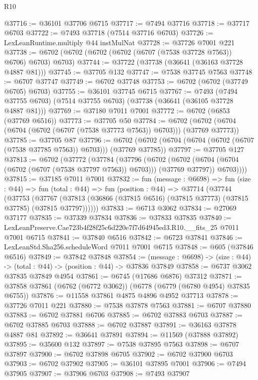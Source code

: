 \begin{lexlean}{R10}
\begin{coremodule}
@37716 := @36101 @37706 @6715
@37717 := @7494 @37716
@37718 := @37717 @6703
@37722 := @7493 @37718 (@7514 @37716 @6703)
@37726 := LexLeanRuntime.multiply @44 instMulNat
@37728 := @37726 @7001 @221
@37738 := @6702 (@6702 (@6702 (@6702 (@6707 (@7538 @37728 @7563)) @6706) @6703) @6703)
@37744 := @37722 (@37738 (@36641 (@36163 @37728 @4887 @81)))
@37745 := @37705 @132
@37747 := @7538 @37745 @7563
@37748 := @6707 @37747
@37749 := @6702 @37748
@37753 := @6702 (@6702 (@37749 @6705) @6703)
@37755 := @36101 @37745 @6715
@37767 := @7493
    (@7494 @37755 @6703)
    (@7514 @37755 @6703)
    (@37738 (@36641 (@36105 @37728 @4887 @81)))
@37769 := @37180 @7011 @7001
@37772 := @6702 (@6853 (@37769 @6516))
@37773 := @37705 @50
@37784 := @6702 (@6702 (@6704 (@6704 (@6702 (@6707 (@7538 @37773 @7563)) @6703))) (@37769 @37773))
@37785 := @37705 @87
@37796 := @6702 (@6702 (@6704 (@6704 (@6702 (@6707 (@7538 @37785 @7563)) @6703))) (@37769 @37785))
@37797 := @37705 @127
@37813 := @6702
    (@37772
      (@37784
        (@37796
          (@6702
            (@6702 (@6704 (@6704 (@6702 (@6707 (@7538 @37797 @7563)) @6703))) (@37769 @37797))
            @6703))))
@37815 := @37185 @7011 @7001
@37832 := fun (message : @6698) =>
  fun (size : @44) =>
  fun (total : @44) =>
  fun (position : @44) =>
  @37714
    (@37744
      (@37753
        (@37767 (@37813 (@36866 (@37815 @6516) (@37815 @37773) (@37815 @37785) (@37815 @37797))))))
@37833 := @6713 @3062
@37834 := @27069 @37177
@37835 := @37339 @37834
@37836 := @37833 @37835
@37840 := LexLeanPreserve.Cae723b4f28f25c6d220e7f7d64945ed3.R10.__fits_25 @7011 @7001 @6715
@37841 := @37840 @6516
@37842 := @6723 @37841
@37846 := LexLeanStd.Sha256.scheduleWord @7011 @7001 @6715
@37848 := @605 (@37846 @6516)
@37849 := @37842 @37848
@37854 := (message : @6698) -> (size : @44) -> (total : @44) -> (position : @44) -> @37836 @37849
@37858 := @6737 @3062 @37835 @37849 @4954
@37861 := @6745 (@17686 @6876) @37312
@37871 := @37858 @37861 (@6762 (@6772 @3062)) (@6778 (@6779 (@6780 @4954) @37835 @6755))
@37876 := @11558 @37861 @4875 @4896 @4952 @37713
@37878 := @37726 @7011 @221
@37880 := @7538 @37878 @7563
@37881 := @6707 @37880
@37883 := @6702 @37881 @6706
@37885 := @6702 @37883 @6703
@37887 := @6702 @37885 @6703
@37888 := @6702 @37887
@37891 := @36163 @37878 @4887 @81
@37892 := @36641 @37891
@37894 := @11569 (@37888 @37892)
@37895 := @35600 @132
@37897 := @7538 @37895 @7563
@37898 := @6707 @37897
@37900 := @6702 @37898 @6705
@37902 := @6702 @37900 @6703
@37903 := @6702 @37902
@37905 := @36101 @37895 @7001
@37906 := @7494 @37905
@37907 := @37906 @6703
@37908 := @7493 @37907

\end{coremodule}
\end{lexlean}

